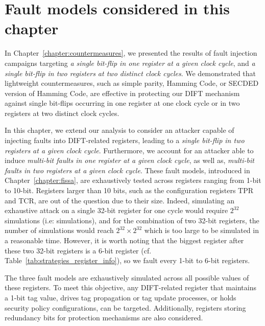 \section{Fault models considered in this chapter}
\label{section:chap6_faultmodels}
In Chapter~\ref{chapter:countermeasures}, we presented the results of fault injection campaigns targeting \textit{a single bit-flip in one register at a given clock cycle}, and \textit{a single bit-flip in two registers at two distinct clock cycles}. We demonstrated that lightweight countermeasures, such as simple parity, Hamming Code, or SECDED version of Hamming Code, are effective in protecting our DIFT mechanism against single bit-flips occurring in one register at one clock cycle or in two registers at two distinct clock cycles.

In this chapter, we extend our analysis to consider an attacker capable of injecting faults into DIFT-related registers, leading to a \textit{single bit-flip in two registers at a given clock cycle}. Furthermore, we account for an attacker able to induce \textit{multi-bit faults in one register at a given clock cycle}, as well as, \textit{multi-bit faults in two registers at a given clock cycle}. These fault models, introduced in Chapter~\ref{chapter:fissa}, are exhaustively tested across registers ranging from 1-bit to 10-bit. Registers larger than 10 bits, such as the configuration registers TPR and TCR, are out of the question due to their size. Indeed, simulating an exhaustive attack on a single 32-bit register for one cycle would require $2^{32}$ simulations (i.e:  simulations), and for the combination of two 32-bit registers, the number of simulations would reach $2^{32} \times 2^{32}$ which is too large to be simulated in a reasonable time. However, it is worth noting that the biggest register after these two 32-bit registers is a 6-bit register (cf. Table~\ref{tab:strategies_register_info}), so we fault every 1-bit to 6-bit registers.

The three fault models are exhaustively simulated across all possible values of these registers. To meet this objective, any DIFT-related register that maintains a 1-bit tag value, drives tag propagation or tag update processes, or holds security policy configurations, can be targeted. Additionally, registers storing redundancy bits for protection mechanisms are also considered.

